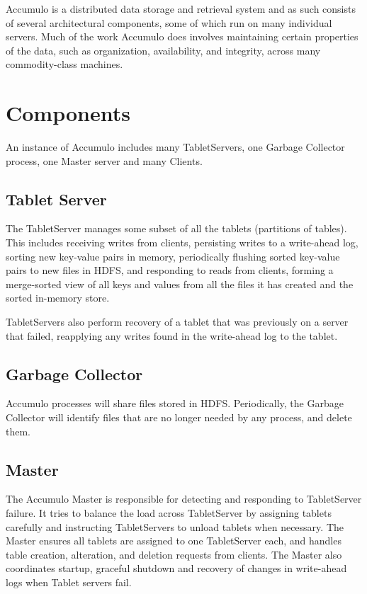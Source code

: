 Accumulo is a distributed data storage and retrieval system and as such consists of
several architectural components, some of which run on many individual servers.
Much of the work Accumulo does involves maintaining certain properties of the
data, such as organization, availability, and integrity, across many commodity-class
machines.

\section{Components}

An instance of Accumulo includes many TabletServers, one Garbage Collector process, 
one Master server and many Clients.

\subsection{Tablet Server}

The TabletServer manages some subset of all the tablets (partitions of tables). This includes receiving writes from clients, persisting writes to a
write-ahead log, sorting new key-value pairs in memory, periodically
flushing sorted key-value pairs to new files in HDFS, and responding
to reads from clients, forming a merge-sorted view of all keys and
values from all the files it has created and the sorted in-memory
store.

TabletServers also perform recovery of a tablet
that was previously on a server that failed, reapplying any writes
found in the write-ahead log to the tablet.

\subsection{Garbage Collector}

Accumulo processes will share files stored in HDFS. Periodically, the Garbage
Collector will identify files that are no longer needed by any process, and
delete them.

\subsection{Master}

The Accumulo Master is responsible for detecting and responding to TabletServer
failure. It tries to balance the load across TabletServer by assigning tablets carefully
and instructing TabletServers to unload tablets when necessary. The Master ensures all
tablets are assigned to one TabletServer each, and handles table creation, alteration,
and deletion requests from clients. The Master also coordinates startup, graceful
shutdown and recovery of changes in write-ahead logs when Tablet servers fail.

